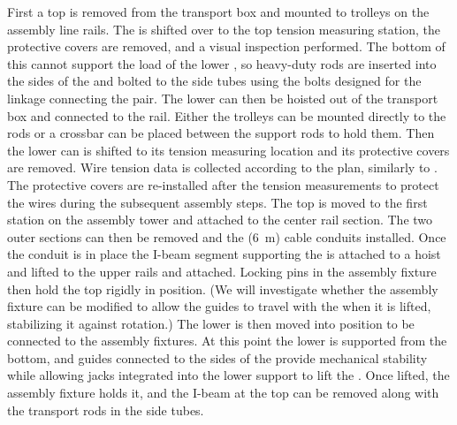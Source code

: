 First a top  is removed from the transport box and mounted to trolleys on the assembly line rails. 
The  is shifted over to the top  tension measuring station, the protective covers are removed, and a visual inspection performed. 
The bottom of this  cannot support the load of the lower , so heavy-duty rods are inserted into the sides of the  and bolted to the side tubes using the bolts designed for the linkage connecting the  pair. 
The lower  can then be hoisted out of the transport box and connected to the rail. 
 Either the trolleys can be mounted directly to the rods or  a crossbar can be %
placed between the support rods to hold them. %
Then the lower  can %
is shifted to its tension measuring location and its protective covers are removed. 
Wire tension data is collected according to the  plan, similarly to . 
The protective covers are re-installed after the tension measurements to protect the wires during the subsequent assembly steps. 
The top  is %
moved to the first station on the  assembly tower and attached to the center rail section. 
The two outer sections can then be removed and the (\SI{6}{m}) cable conduits installed. 
Once the conduit is in place the I-beam segment supporting the  is attached to a hoist and lifted to the upper rails and attached. 
Locking pins in the  assembly fixture then hold the top  rigidly in position. %
(We will investigate whether the assembly fixture can be modified to allow %
the guides to %
travel with the  when it is lifted, %
stabilizing it against rotation.)  
The lower  is then moved into position to be connected to the assembly fixtures. 
At this point the  lower  is supported from the bottom, and guides connected to the sides of the  provide mechanical stability while allowing jacks integrated into the lower support to lift the . %
Once lifted, the assembly fixture holds it, and the I-beam at the top can be removed along with the transport rods in the side tubes. 

